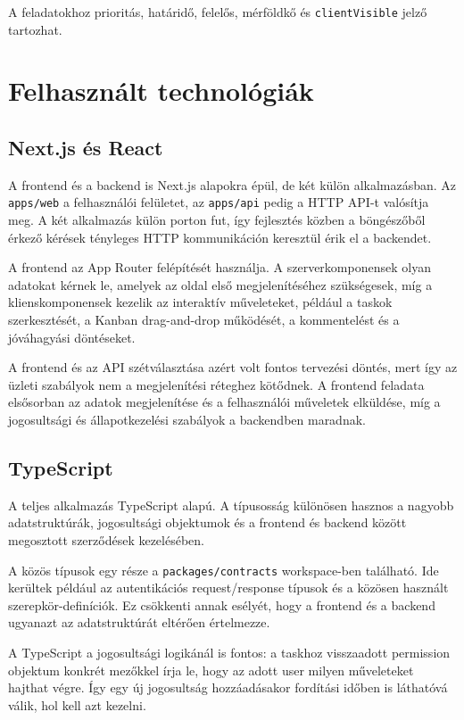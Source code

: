 \documentclass[11pt,a4paper]{report}
\begin{document}
    A feladatokhoz prioritás, határidő, felelős, mérföldkő és
    \texttt{clientVisible} jelző tartozhat.

    \chapter{Felhasznált technológiák}

    \section{Next.js és React}

    A frontend és a backend is Next.js alapokra épül, de két külön alkalmazásban.
    Az \texttt{apps/web} a felhasználói felületet, az \texttt{apps/api} pedig a
    HTTP API-t valósítja meg. A két alkalmazás külön porton fut, így fejlesztés
    közben a böngészőből érkező kérések tényleges HTTP kommunikáción keresztül
    érik el a backendet.

    A frontend az App Router felépítését használja. A szerverkomponensek olyan
    adatokat kérnek le, amelyek az oldal első megjelenítéséhez szükségesek, míg a
    klienskomponensek kezelik az interaktív műveleteket, például a taskok
    szerkesztését, a Kanban drag-and-drop működését, a kommentelést és a
    jóváhagyási döntéseket.

    A frontend és az API szétválasztása azért volt fontos tervezési döntés, mert
    így az üzleti szabályok nem a megjelenítési réteghez kötődnek. A frontend
    feladata elsősorban az adatok megjelenítése és a felhasználói műveletek
    elküldése, míg a jogosultsági és állapotkezelési szabályok a backendben
    maradnak.

    \section{TypeScript}

    A teljes alkalmazás TypeScript alapú. A típusosság különösen hasznos a nagyobb
    adatstruktúrák, jogosultsági objektumok és a frontend és backend között
    megosztott szerződések kezelésében.

    A közös típusok egy része a \texttt{packages/contracts} workspace-ben
    található. Ide kerültek például az autentikációs request/response típusok és a
    közösen használt szerepkör-definíciók. Ez csökkenti annak esélyét, hogy a
    frontend és a backend ugyanazt az adatstruktúrát eltérően értelmezze.

    A TypeScript a jogosultsági logikánál is fontos: a taskhoz visszaadott
    permission objektum konkrét mezőkkel írja le, hogy az adott user milyen
    műveleteket hajthat végre. Így egy új jogosultság hozzáadásakor fordítási időben
    is láthatóvá válik, hol kell azt kezelni.
\end{document}
